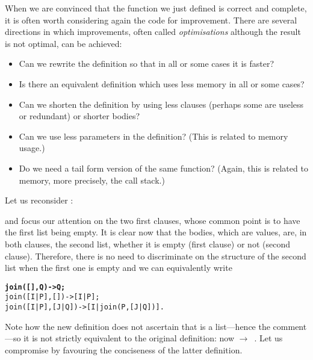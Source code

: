 When we are convinced that the function we just defined is correct and
complete, it is often worth considering again the code for
improvement. There are several directions in which improvements, often
called \emph{optimisations} although the result is not optimal, can be
achieved:
\begin{itemize}

  \item Can we rewrite the definition so that in all or some cases it
    is faster? 

  \item Is there an equivalent definition which uses less memory in
    all or some cases?

  \item Can we shorten the definition by using less clauses (perhaps
    some are useless or redundant) or shorter bodies?

  \item Can we use less parameters in the definition? (This is related
    to memory usage.)

  \item Do we need a tail form version of the same function?
    (Again, this is related to memory, more precisely, the call
    stack.)

\end{itemize}
Let us reconsider :

and focus our attention on the two first clauses, whose common point
is to have the first list being empty. It is clear now that the
bodies, which are values, are, in both clauses, the second list,
whether it is empty (first clause) or not (second clause). Therefore,
there is no need to discriminate on the structure of the second list
when the first one is empty and we can equivalently write
\begin{alltt}
\textbf{join(   [],    Q) -> Q;}\hfill% Q \emph{is a list}
join([I|P],   []) -> [I|P];
join([I|P],[J|Q]) -> [I|join(P,[J|Q])].
\end{alltt}
Note how the new definition does not ascertain that  is a
list---hence the comment---so it is not strictly equivalent to the
original definition: now 
\(\rightarrow\)~. Let us compromise by favouring the
conciseness of the latter definition.

